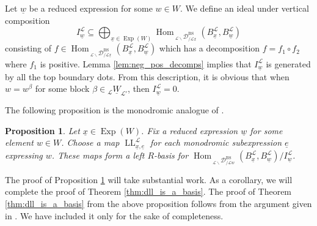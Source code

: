 \documentclass{amsart}
\newcommand{\scrL}{\mathcal{L}}
\DeclareMathOperator{\Hom}{Hom}
\DeclareMathOperator{\BS}{BS}
\DeclareMathOperator{\LL}{LL}
\newcommand{\EWmon}[2]{\:_{#1 \backslash} \mathcal{D}_{/ #2} }
\DeclareMathOperator{\Exp}{Exp}
\newcommand{\uW}[2]{{}_{#1}\underline{W}_{#2}}
\newcommand{\ue}{\underline{e}}
\newcommand{\uw}{\underline{w}}
\newcommand{\ux}{\underline{x}}
\newtheorem{proposition}[subsubsection]{Proposition}
\theoremstyle{definition}
\numberwithin{equation}{subsection}
\begin{document}
Let $\uw$ be a reduced expression for some $w \in W$. 
We define an ideal under vertical composition 
\[ I_{\uw}^{\scrL} \subseteq \bigoplus_{\ux \in \Exp (W)} \Hom_{\EWmon{\scrL}{\scrL \ux}^{\BS}} (B_{\ux}^{\scrL}, B_{\uw}^{\scrL})\] 
consisting of $f \in \Hom_{\EWmon{\scrL}{\scrL \ux}^{\BS}} (B_{\ux}^{\scrL}, B_{\uw}^{\scrL})$ which has a decomposition $f = f_1 \circ f_2$ where $f_1$ is positive.
Lemma \ref{lem:neg_pos_decomps} implies that $I_{\uw}^{\scrL}$ is generated by all the top boundary dots. 
From this description, it is obvious that when $w = w^\beta$ for some block $\beta \in \uW{\scrL}{\scrL'}$, then $I_{\uw}^{\scrL} = 0$.

The following proposition is the monodromic analogue of \cite[Proposition 7.6]{EW}. 

\begin{proposition}\label{prop:the_evil_EW_prop}
    Let $\ux \in \Exp (W)$. Fix a reduced expression $\uw$ for some element $w \in W$. 
    Choose a map $\LL_{\ux, \ue}^{\scrL}$ for each monodromic subexpression $\ue$ expressing $w$.
    These maps form a left $R$-basis for $\Hom_{\EWmon{\scrL}{\scrL w}^{\BS}} (B_{\ux}^{\scrL}, B_{\uw}^{\scrL}) / I_{\uw}^{\scrL}$.
\end{proposition}

The proof of Proposition \ref{prop:the_evil_EW_prop} will take substantial work. 
As a corollary, we will complete the proof of Theorem \ref{thm:dll_is_a_basis}. The proof of Theorem \ref{thm:dll_is_a_basis} from the above proposition follows from the argument given in \cite[\S 7.3]{EW}.
We have included it only for the sake of completeness. 
\end{document}
